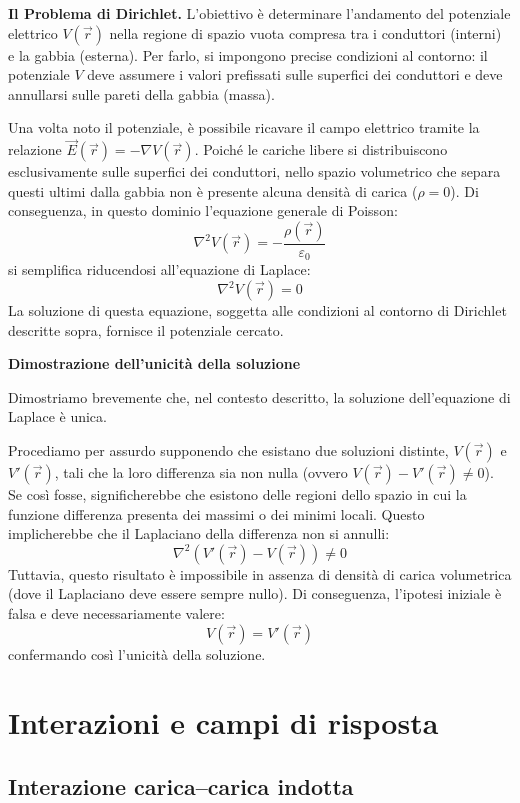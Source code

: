 \documentclass{book}
\begin{document}
\medskip

\noindent\textbf{Il Problema di Dirichlet.} L'obiettivo è determinare l'andamento del potenziale elettrico \(V(\vec r)\) nella regione di spazio vuota compresa tra i conduttori (interni) e la gabbia (esterna). Per farlo, si impongono precise condizioni al contorno: il potenziale \(V\) deve assumere i valori prefissati sulle superfici dei conduttori e deve annullarsi sulle pareti della gabbia (massa).

Una volta noto il potenziale, è possibile ricavare il campo elettrico tramite la relazione \(\vec{E}(\vec r)=-\nabla V(\vec r)\).
Poiché le cariche libere si distribuiscono esclusivamente sulle superfici dei conduttori, nello spazio volumetrico che separa questi ultimi dalla gabbia non è presente alcuna densità di carica (\(\rho=0\)). Di conseguenza, in questo dominio l'equazione generale di Poisson:
\[
\nabla^2 V(\vec r) = -\frac{\rho(\vec r)}{\varepsilon_0}
\]
si semplifica riducendosi all'equazione di Laplace:
\[
\nabla^2 V(\vec r)=0
\]
La soluzione di questa equazione, soggetta alle condizioni al contorno di Dirichlet descritte sopra, fornisce il potenziale cercato.
\bigskip



\noindent\textbf{Dimostrazione dell'unicità della soluzione}

Dimostriamo brevemente che, nel contesto descritto, la soluzione dell'equazione di Laplace è unica.

Procediamo per assurdo supponendo che esistano due soluzioni distinte, \(V(\vec{r})\) e \(V'(\vec{r})\), tali che la loro differenza sia non nulla (ovvero \(V(\vec{r})-V'(\vec{r}) \neq 0\)).
Se così fosse, significherebbe che esistono delle regioni dello spazio in cui la funzione differenza presenta dei massimi o dei minimi locali. Questo implicherebbe che il Laplaciano della differenza non si annulli:
\[
\nabla^2 (V'(\vec{r})-V(\vec{r})) \neq 0
\]
Tuttavia, questo risultato è impossibile in assenza di densità di carica volumetrica (dove il Laplaciano deve essere sempre nullo). Di conseguenza, l'ipotesi iniziale è falsa e deve necessariamente valere:
\[
V(\vec{r})=V'(\vec{r})
\]
confermando così l'unicità della soluzione.

\chapter{Interazioni e campi di risposta}

\section{Interazione carica--carica indotta}
\end{document}
